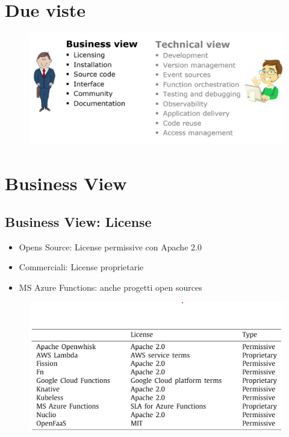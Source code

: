 \documentclass[a4paper, 12pt]{report}
\begin{document}
          \section{Due viste}
          \begin{figure}[h]
            \centering
            \includegraphics[scale=0.3]{Immagini/TwoViews.png}
          \end{figure}
          \section{Business View}
          \subsection{Business View: License}
            \begin{itemize}
              \item Opens Source: License permissive con Apache 2.0
              \item Commerciali: License proprietarie
              \item MS Azure Functions: anche progetti open sources
            \end{itemize}
            \begin{figure}[h]
              \centering
              \includegraphics[scale=0.4]{Immagini/License.png}
            \end{figure}
\end{document}
